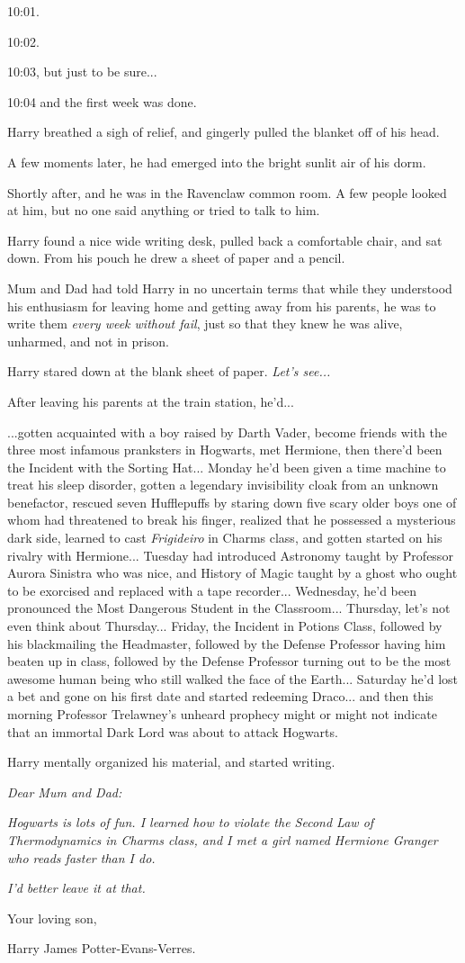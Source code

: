 10:01.

10:02.

10:03, but just to be sure...

10:04 and the first week was done.

Harry breathed a sigh of relief, and gingerly pulled the blanket off of his head.

A few moments later, he had emerged into the bright sunlit air of his dorm.

Shortly after, and he was in the Ravenclaw common room. A few people looked at him, but no one said anything or tried to talk to him.

Harry found a nice wide writing desk, pulled back a comfortable chair, and sat down. From his pouch he drew a sheet of paper and a pencil.

Mum and Dad had told Harry in no uncertain terms that while they understood his enthusiasm for leaving home and getting away from his parents, he was to write them \emph{every week without fail}, just so that they knew he was alive, unharmed, and not in prison.

Harry stared down at the blank sheet of paper. \emph{Let's see...}

After leaving his parents at the train station, he'd...

...gotten acquainted with a boy raised by Darth Vader, become friends with the three most infamous pranksters in Hogwarts, met Hermione, then there'd been the Incident with the Sorting Hat... Monday he'd been given a time machine to treat his sleep disorder, gotten a legendary invisibility cloak from an unknown benefactor, rescued seven Hufflepuffs by staring down five scary older boys one of whom had threatened to break his finger, realized that he possessed a mysterious dark side, learned to cast \emph{Frigideiro} in Charms class, and gotten started on his rivalry with Hermione... Tuesday had introduced Astronomy taught by Professor Aurora Sinistra who was nice, and History of Magic taught by a ghost who ought to be exorcised and replaced with a tape recorder... Wednesday, he'd been pronounced the Most Dangerous Student in the Classroom... Thursday, let's not even think about Thursday... Friday, the Incident in Potions Class, followed by his blackmailing the Headmaster, followed by the Defense Professor having him beaten up in class, followed by the Defense Professor turning out to be the most awesome human being who still walked the face of the Earth... Saturday he'd lost a bet and gone on his first date and started redeeming Draco... and then this morning Professor Trelawney's unheard prophecy might or might not indicate that an immortal Dark Lord was about to attack Hogwarts.

Harry mentally organized his material, and started writing.

\emph{Dear Mum and Dad:}

\emph{Hogwarts is lots of fun. I learned how to violate the Second Law of Thermodynamics in Charms class, and I met a girl named Hermione Granger who reads faster than I do.}

\emph{I'd better leave it at that.}

Your loving son,

Harry James Potter-Evans-Verres.
